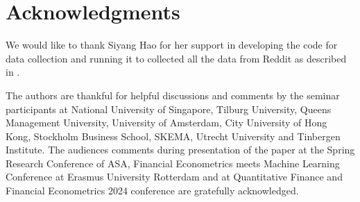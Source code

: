 \documentclass[11pt,a4paper,rorate,times]{article}
\newcommand{\hl}[1]{{\color{red}#1}}
\begin{document}



\newpage

\section*{Acknowledgments} 
We would like to thank Siyang Hao for her support in developing the code for data collection and running it to collected all the data from Reddit as described in \citet{wang2024social}. 

The authors are thankful for helpful discussions and comments by the seminar participants at National University of Singapore, Tilburg University, Queens Management University, University of Amsterdam, City University of Hong Kong, Stockholm Business School, SKEMA, Utrecht University and Tinbergen Institute. The audiences comments during presentation of the paper at the Spring Research Conference of ASA, Financial Econometrics meets Machine Learning Conference at Erasmus University Rotterdam and at Quantitative Finance and Financial Econometrics 2024 conference are gratefully acknowledged.

%	
\end{document}
